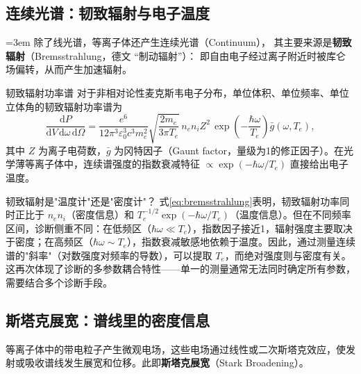 \documentclass[12pt,a4paper,openany,oneside]{book}
\newcommand{\diff}{\mathrm{d}}
\newcommand{\eps}{\varepsilon}
\begin{document}
\subsection{连续光谱：韧致辐射与电子温度}

{\emergencystretch=3em
除了线光谱，等离子体还产生连续光谱（Continuum），
其主要来源是\textbf{韧致辐射}（Bremsstrahlung，德文 ``制动辐射''）：
即自由电子经过离子附近时被库仑场偏转，从而产生加速辐射。\par}

\begin{theorem}{韧致辐射功率谱}{}{}
对于非相对论性麦克斯韦电子分布，单位体积、单位频率、单位立体角的韧致辐射功率谱为
\begin{equation}
\frac{\diff P}{\diff V\,\diff\omega\,\diff\Omega} = \frac{e^6}{12\pi^3\eps_0^3 c^3 m_e^2}\sqrt{\frac{2m_e}{3\pi T_e}}\,n_e n_i Z^2\,\exp\!\left(-\frac{\hbar\omega}{T_e}\right) \bar{g}(\omega, T_e),
\label{eq:bremsstrahlung}
\end{equation}
其中 $Z$ 为离子电荷数，$\bar{g}$ 为冈特因子（Gaunt factor，量级为1的修正因子）。在光学薄等离子体中，连续谱强度的指数衰减特征 $\propto \exp(-\hbar\omega/T_e)$ 直接给出电子温度。
\end{theorem}

\begin{insight}{韧致辐射是"温度计"还是"密度计"？}{}
式\eqref{eq:bremsstrahlung}表明，韧致辐射功率同时正比于 $n_e n_i$（密度信息）和 $T_e^{-1/2}\exp(-\hbar\omega/T_e)$（温度信息）。但在不同频率区间，诊断侧重不同：在低频区（$\hbar\omega \ll T_e$），指数因子接近1，辐射强度主要取决于密度；在高频区（$\hbar\omega \sim T_e$），指数衰减敏感地依赖于温度。因此，通过测量连续谱的"斜率"（对数强度对频率的导数），可以提取 $T_e$，而绝对强度则与密度有关。这再次体现了诊断的多参数耦合特性——单一的测量通常无法同时确定所有参数，需要结合多个诊断手段。
\end{insight}

\subsection{斯塔克展宽：谱线里的密度信息}

等离子体中的带电粒子产生微观电场，这些电场通过线性或二次斯塔克效应，使发射或吸收谱线发生展宽和位移。此即\textbf{斯塔克展宽}（Stark Broadening）。
\end{document}
